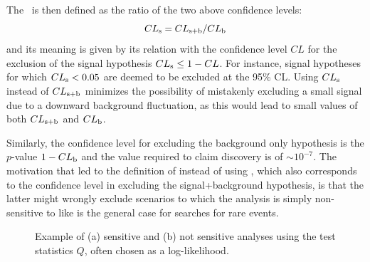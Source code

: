 The \ is then defined as the ratio of the two above confidence levels:
\begin{equation}\label{eq:cls}
\cls{s} = \cls{s+b}/\cls{b}
\end{equation}
and its meaning is given by its relation with the confidence 
level $CL$ for the exclusion of the signal hypothesis 
$\cls{s} \leq 1 - CL$. 
For instance, signal hypotheses for which
$\cls{s} < 0.05$ are deemed to be excluded at the 95\% CL.
Using $\cls{s}$ instead of $\cls{s+b}$ minimizes the possibility 
of mistakenly excluding a small signal due 
to a downward background fluctuation, 
as this would lead to small values of both $\cls{s+b}$ and $\cls{b}$.

Similarly, the confidence level for excluding the background only
hypothesis is the $p$-value $1 - \cls{b}$ and the value required to claim 
discovery is of $\sim 10^{-7}$. The motivation that led to
the definition of  instead of using , which also
corresponds to the confidence level in excluding the signal+background
hypothesis, is that the latter might wrongly exclude scenarios to
which the analysis is simply non-sensitive to like is the general case
for searches for rare events.

\begin{figure}[htb]\begin{center}
	\caption{Example of (a) sensitive and (b) not sensitive analyses using the test 
        statistics $Q$, often chosen as a log-likelihood.\label{fig:LLR}} %
\end{center}\end{figure}



